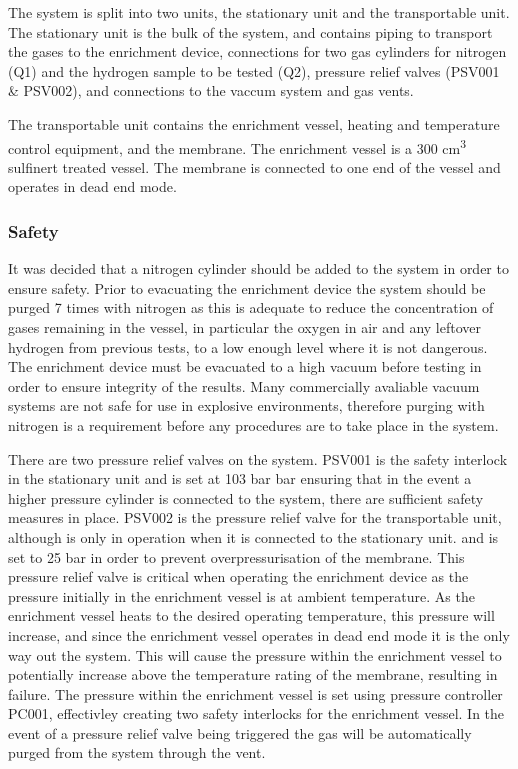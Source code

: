 The system is split into two units, the stationary unit and the transportable unit. The stationary unit is the bulk of the system, and contains piping to transport the gases to the enrichment device, connections for two gas cylinders for nitrogen (Q1) and the hydrogen sample to be tested (Q2), pressure relief valves (PSV001 \& PSV002), and connections to the vaccum system and gas vents. 

The transportable unit contains the enrichment vessel, heating and temperature control equipment, and the membrane. The enrichment vessel is a 300 cm\textsuperscript{3} sulfinert \cite{sulfinerttreatedsamplecylinder} treated vessel. The membrane is connected to one end of the vessel and operates in dead end mode. 

\subsubsection*{Safety}
It was decided that a nitrogen cylinder should be added to the system in order to ensure safety. Prior to evacuating the enrichment device the system should be purged 7 times with nitrogen  as this is adequate to reduce the concentration of gases remaining in the vessel, in particular the oxygen in air and any leftover hydrogen from previous tests, to a low enough level where it is not dangerous. \cite{BACQUART20205565} The enrichment device must be evacuated to a high vacuum before testing in order to ensure integrity of the results. Many commercially avaliable vacuum systems are not safe for use in explosive environments, therefore purging with nitrogen is a requirement before any procedures are to take place in the system. 

There are two pressure relief valves on the system. PSV001 is the safety interlock in the stationary unit and is set at 103 bar bar ensuring that in the event a higher pressure cylinder is connected to the system, there are sufficient safety measures in place. PSV002 is the pressure relief valve for the transportable unit, although is only in operation when it is connected to the stationary unit. and is set to 25 bar in order to prevent overpressurisation of the membrane. This pressure relief valve is critical when operating the enrichment device as the pressure initially in the enrichment vessel is at ambient temperature. As the enrichment vessel heats to the desired operating temperature, this pressure will increase, and since the enrichment vessel operates in dead end mode it is the only way out the system. This will cause the pressure within the enrichment vessel to potentially increase above the temperature rating of the membrane, resulting in failure. The pressure within the enrichment vessel is set using pressure controller PC001, effectivley creating two safety interlocks for the enrichment vessel. In the event of a pressure relief valve being triggered the gas will be automatically purged from the system through the vent.

